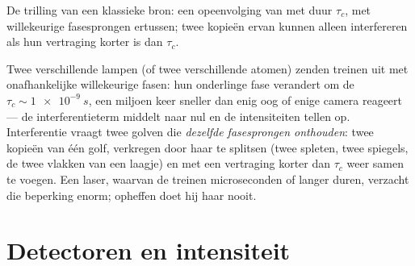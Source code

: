 \begin{omfigure}

{\small De trilling van een klassieke bron: een opeenvolging van 
met duur $\tau_c$, met willekeurige fasesprongen ertussen; twee kopieën
ervan kunnen alleen interfereren als hun vertraging korter is dan $\tau_c$.}
\end{omfigure}

\begin{remark}\label{rem:b2:scalar-light-model:twosources}
Twee verschillende lampen (of twee verschillende atomen) zenden treinen uit
met onafhankelijke willekeurige fasen: hun onderlinge fase verandert om de
$\tau_c
\sim \qty{1e-9}{s}$, een miljoen keer sneller dan enig oog of enige
camera reageert --- de interferentieterm middelt naar nul en de
intensiteiten tellen op. Interferentie vraagt twee golven die \emph{dezelfde
fasesprongen onthouden}: twee kopieën van één golf, verkregen door haar te
splitsen (twee spleten, twee spiegels, de twee vlakken van een laagje) en
met een vertraging korter dan $\tau_c$ weer samen te voegen. Een laser,
waarvan de treinen microseconden of langer duren, verzacht die beperking
enorm; opheffen doet hij haar nooit.
\end{remark}

\section{Detectoren en intensiteit}

